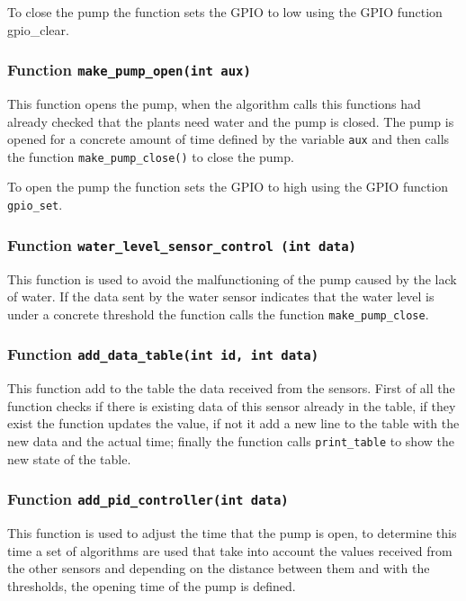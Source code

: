 \documentclass[11pt,paper=a4,parskip=half]{scrartcl}
\begin{document}
To close the pump the function sets the GPIO to low using the GPIO function
gpio\_clear.

\subsubsection{Function \texttt{make\_pump\_open(int aux)}}

This function opens the pump, when the algorithm calls this functions had
already checked that the plants need water and the pump is closed. The pump is
opened for a concrete amount of time defined by the variable \verb`aux` and then calls
the function \texttt{make\_pump\_close()} to close the pump.

To open the pump the function sets the GPIO to high using the GPIO function
\texttt{gpio\_set}.

\subsubsection{Function \texttt{water\_level\_sensor\_control (int data)}}

This function is used to avoid the malfunctioning of the pump caused by the
lack of water. If the data sent by the water sensor indicates that the water
level is under a concrete threshold the function calls the function
\texttt{make\_pump\_close}.

\subsubsection{Function \texttt{add\_data\_table(int id, int data)}}

This function add to the table the data received from the sensors. First of all the function checks if there is existing data of this sensor already in the table, if they exist the function updates the value, if not it add a new line to the table with the new data and the actual time; finally the function calls \verb`print_table` to show the new state of the table.

\subsubsection{Function \texttt{add\_pid\_controller(int data)}}

This function is used to adjust the time that the pump is open, to determine
this time a set of algorithms are used that take into account the values
received from the other sensors and depending on the distance between
them and with the thresholds, the opening time of the pump is defined.
\end{document}
